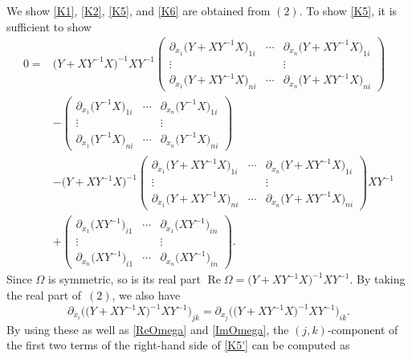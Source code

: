 \documentclass[pdftex]{sigma}
\numberwithin{equation}{section}
\def\re{\operatorname{Re}}
\begin{document}
We show \eqref{K1}, \eqref{K2}, \eqref{K5}, and \eqref{K6} are obtained from $(2)$. %
To show \eqref{K5}, it is sufficient to show
\begin{align}
0={}& \bigl(Y+XY^{-1}X\bigr)^{-1}XY^{-1}
\begin{pmatrix}
\partial_{x_1}\bigl(Y+XY^{-1}X\bigr)_{1i} & \cdots & \partial_{x_n}\bigl(Y+XY^{-1}X\bigr)_{1i} \\
\vdots & & \vdots \\
\partial_{x_1}\bigl(Y+XY^{-1}X\bigr)_{ni} & \cdots & \partial_{x_n}\bigl(Y+XY^{-1}X\bigr)_{ni}
\end{pmatrix} \nonumber \\
&-
\begin{pmatrix}
\partial_{x_1}\bigl(Y^{-1}X\bigr)_{1i} & \cdots & \partial_{x_n}\bigl(Y^{-1}X\bigr)_{1i} \\
\vdots & & \vdots \\
\partial_{x_1}\bigl(Y^{-1}X\bigr)_{ni} & \cdots & \partial_{x_n}\bigl(Y^{-1}X\bigr)_{ni}
\end{pmatrix} \nonumber \\
&-\bigl(Y+XY^{-1}X\bigr)^{-1}
\begin{pmatrix}
\partial_{x_1}\bigl(Y+XY^{-1}X\bigr)_{1i} & \cdots & \partial_{x_n}\bigl(Y+XY^{-1}X\bigr)_{1i} \\
\vdots & & \vdots \\
\partial_{x_1}\bigl(Y+XY^{-1}X\bigr)_{ni} & \cdots & \partial_{x_n}\bigl(Y+XY^{-1}X\bigr)_{ni}
\end{pmatrix}
XY^{-1}\nonumber \\
&+
\begin{pmatrix}
\partial_{x_1}\bigl(XY^{-1}\bigr)_{i1} & \cdots & \partial_{x_1}\bigl(XY^{-1}\bigr)_{in} \\
\vdots & & \vdots \\
\partial_{x_n}\bigl(XY^{-1}\bigr)_{i1} & \cdots & \partial_{x_n}\bigl(XY^{-1}\bigr)_{in}
\end{pmatrix}.\label{K5'}
\end{align}
Since $\Omega$ is symmetric, so is its real part $\re \Omega=\bigl(Y+XY^{-1}X\bigr)^{-1}XY^{-1}$. By taking the real part of~$(2)$, we also have
\[
\partial_{x_i}\bigl(\bigl(Y+XY^{-1}X\bigr)^{-1}XY^{-1}\bigr)_{jk}=\partial_{x_j}\bigl(\bigl(Y+XY^{-1}X\bigr)^{-1}XY^{-1}\bigr)_{ik}.
\]
By using these as well as \eqref{ReOmega} and \eqref{ImOmega}, the $(j, k)$-component of the first two terms of the right-hand side of \eqref{K5'} can be computed as
\end{document}
